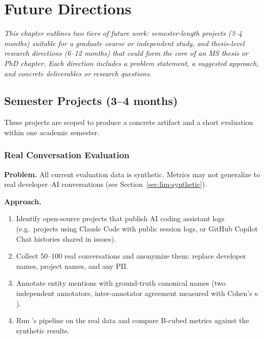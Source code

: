 \chapter{Future Directions}
\label{ch:future-directions}

\textit{This chapter outlines two tiers of future work: semester-length
projects (3--4 months) suitable for a graduate course or independent study,
and thesis-level research directions (6--12 months) that could form the
core of an MS thesis or PhD chapter.  Each direction includes a problem
statement, a suggested approach, and concrete deliverables or research
questions.}


\section{Semester Projects (3--4 months)}
\label{sec:future-semester}

These projects are scoped to produce a concrete artifact and a short
evaluation within one academic semester.


\subsection{Real Conversation Evaluation}
\label{sec:future-real-eval}

\noindent\textbf{Problem.}
All current evaluation data is synthetic.  Metrics may not generalize to
real developer--AI conversations (see
Section~\ref{sec:lim-synthetic}).

\medskip\noindent\textbf{Approach.}

\begin{enumerate}
    \item Identify open-source projects that publish AI coding assistant
          logs (e.g.\ projects using Claude Code with public session logs,
          or GitHub Copilot Chat histories shared in issues).
    \item Collect 50--100 real conversations and anonymize them: replace
          developer names, project names, and any PII.
    \item Annotate entity mentions with ground-truth canonical names
          (two independent annotators, inter-annotator agreement measured
          with Cohen's $\kappa$).
    \item Run \sysname{}'s pipeline on the real data and compare B-cubed
          metrics against the synthetic results.
\end{enumerate}

